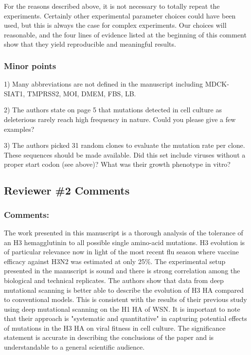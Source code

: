 \documentclass[11pt, oneside]{article}   	%
\newcommand{\response}[1]{{\color{black}#1}}
\begin{document}
\response{For the reasons described above, it is not necessary to totally repeat the experiments.
Certainly other experimental parameter choices could have been used, but this is always the case for complex experiments.
Our choices will reasonable, and the four lines of evidence listed at the beginning of this comment show that they yield reproducible and meaningful results.}

\subsubsection*{Minor points} 

1) Many abbreviations are not defined in the manuscript including MDCK-SIAT1, TMPRSS2, MOI, DMEM, FBS, LB. 

2) The authors state on page 5 that mutations detected in cell culture as deleterious rarely reach high frequency in nature. Could you please give a few examples? 

3) The authors picked 31 random clones to evaluate the mutation rate per clone. These sequences should be made available. Did this set include viruses without a proper start codon (see above)? What was their growth phenotype in vitro? 

\subsection*{Reviewer \#2 Comments} 

\subsubsection*{Comments:} 
The work presented in this manuscript is a thorough analysis of the tolerance of an H3 hemagglutinin to all possible single amino-acid mutations. H3 evolution is of particular relevance now in light of the most recent flu season where vaccine efficacy against H3N2 was estimated at only 25\%. The experimental setup presented in the manuscript is sound and there is strong correlation among the biological and technical replicates. The authors show that data from deep mutational scanning is better able to describe the evolution of H3 HA compared to conventional models. This is consistent with the results of their previous study using deep mutational scanning on the H1 HA of WSN. It is important to note that their approach is "systematic and quantitative" in capturing potential effects of mutations in the H3 HA on viral fitness in cell culture. The significance statement is accurate in describing the conclusions of the paper and is understandable to a general scientific audience. 
\end{document}
